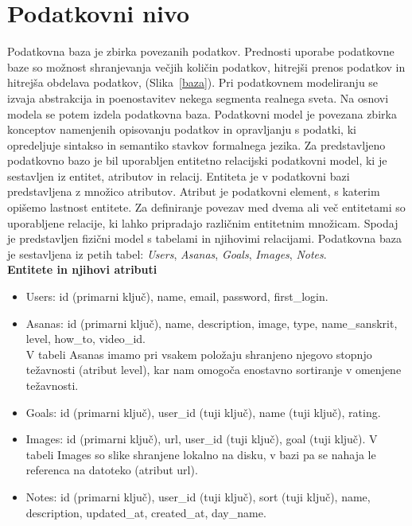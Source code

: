 \documentclass[a4paper, 12pt]{book}
\begin{document}
\section{Podatkovni nivo}
Podatkovna baza je zbirka povezanih podatkov. Prednosti uporabe podatkovne baze so možnost shranjevanja večjih količin podatkov, hitrejši prenos podatkov in hitrejša obdelava podatkov, (Slika~\ref{baza}).
Pri podatkovnem modeliranju se izvaja abstrakcija in poenostavitev nekega segmenta realnega sveta. Na osnovi modela se potem izdela podatkovna baza. Podatkovni model je povezana zbirka konceptov namenjenih opisovanju podatkov in opravljanju s podatki, ki opredeljuje sintakso in semantiko stavkov formalnega jezika. Za predstavljeno podatkovno bazo je bil uporabljen entitetno relacijski podatkovni model, ki je sestavljen iz entitet, atributov in relacij. Entiteta je v podatkovni bazi predstavljena z množico atributov. Atribut je podatkovni element, s katerim opišemo lastnost entitete. Za definiranje povezav med dvema ali več entitetami so uporabljene relacije, ki lahko pripradajo različnim entitetnim množicam. Spodaj je predstavljen fizični model s tabelami in njihovimi relacijami. Podatkovna baza je sestavljena iz petih tabel: \textit{Users}, \textit{Asanas}, \textit{Goals}, \textit{Images}, \textit{Notes}.\\

\textbf{Entitete in njihovi atributi}
  \begin{itemize}
  \item Users: id (primarni ključ), name, email, password, first{\_}login.
  \item Asanas: id (primarni ključ), name, description, image, type, name{\_}sanskrit, level, how{\_}to, video{\_}id.\\
  V tabeli Asanas imamo pri vsakem položaju shranjeno njegovo stopnjo težavnosti (atribut level), kar nam omogoča enostavno sortiranje v omenjene težavnosti.
  \item Goals: id (primarni ključ), user{\_}id (tuji ključ), name (tuji ključ), rating.
  \item Images: id (primarni ključ), url, user{\_}id (tuji ključ), goal (tuji ključ).
  V tabeli Images so slike shranjene lokalno na disku, v bazi pa se nahaja le referenca na datoteko (atribut url). 
  \item Notes: id (primarni ključ), user{\_}id (tuji ključ), sort (tuji ključ), name, description, updated{\_}at, created{\_}at, day{\_}name.
\end{itemize}
\end{document}
